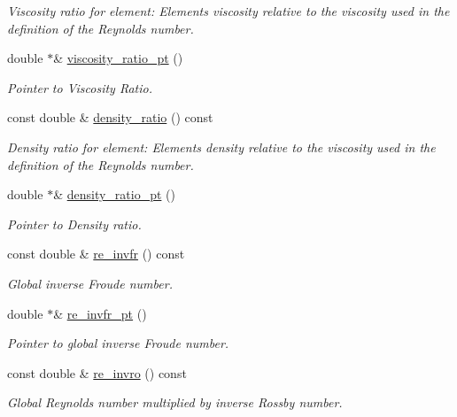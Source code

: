 \begin{DoxyCompactItemize}
\begin{DoxyCompactList}\small\item\em Viscosity ratio for element\+: Element\textquotesingle{}s viscosity relative to the viscosity used in the definition of the Reynolds number. \end{DoxyCompactList}\item 
double $\ast$\& \hyperlink{classoomph_1_1SphericalNavierStokesEquations_af3550eb18343f67f126305c14491a5b8}{viscosity\+\_\+ratio\+\_\+pt} ()
\begin{DoxyCompactList}\small\item\em Pointer to Viscosity Ratio. \end{DoxyCompactList}\item 
const double \& \hyperlink{classoomph_1_1SphericalNavierStokesEquations_a64fc30a2f613c7d0bbd5db7ad8bd27c8}{density\+\_\+ratio} () const
\begin{DoxyCompactList}\small\item\em Density ratio for element\+: Element\textquotesingle{}s density relative to the viscosity used in the definition of the Reynolds number. \end{DoxyCompactList}\item 
double $\ast$\& \hyperlink{classoomph_1_1SphericalNavierStokesEquations_a6128ac34480c1d31531ef4010f755ace}{density\+\_\+ratio\+\_\+pt} ()
\begin{DoxyCompactList}\small\item\em Pointer to Density ratio. \end{DoxyCompactList}\item 
const double \& \hyperlink{classoomph_1_1SphericalNavierStokesEquations_a80f09fb11edfdaa7bb1b262cd6dc9399}{re\+\_\+invfr} () const
\begin{DoxyCompactList}\small\item\em Global inverse Froude number. \end{DoxyCompactList}\item 
double $\ast$\& \hyperlink{classoomph_1_1SphericalNavierStokesEquations_a8b6d0d4b20bc0f62bac8476b6967cd9f}{re\+\_\+invfr\+\_\+pt} ()
\begin{DoxyCompactList}\small\item\em Pointer to global inverse Froude number. \end{DoxyCompactList}\item 
const double \& \hyperlink{classoomph_1_1SphericalNavierStokesEquations_a4a9bb055e3ea5f00d1edee5efcad4937}{re\+\_\+invro} () const
\begin{DoxyCompactList}\small\item\em Global Reynolds number multiplied by inverse Rossby number. \end{DoxyCompactList}\item 

\end{DoxyCompactItemize}
